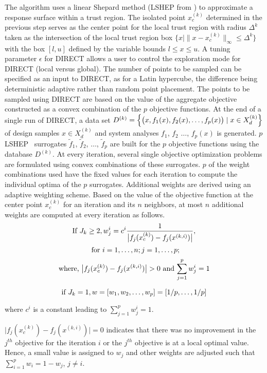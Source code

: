 \noindent The algorithm uses a linear Shepard method (LSHEP from 
\TZWBIB) to approximate a response surface within a trust region. The 
isolated point $x_c^{(k)}$ determined in the previous step serves as the center 
point for the local trust region with radius $\Delta^k$ taken as the 
intersection of the local trust region box $\bigl\{x\mid\|x-x_c^{(k)}\|_\infty 
\le\Delta^k \bigr\}$ with the box $[l,u]$ defined by the variable bounds $l\le 
x \le u$. A tuning parameter $\epsilon$ for DIRECT allows a user to control 
the exploration mode for DIRECT (local versus global). The number of points to 
be sampled can be specified as an input to DIRECT, as for a Latin hypercube, 
the difference being deterministic adaptive rather than random point placement. 
The points to be sampled using DIRECT are based on the value of the 
aggregate objective constructed as a convex combination of the $p$ objective 
functions. At the end of a single run of DIRECT, a data set $D^{(k)}={\Bigl\{
\bigl (x, f_1(x), f_2(x), \ldots, f_p(x)\bigr)\mid x\in X_d^{(k)} \Bigr\}}$ 
of design samples $x\in X_d^{(k)}$ and system analyses $f_1$, $f_2$
$\ldots$, $f_p(x)$ is generated. $p$ LSHEP \TZWBIB\ surrogates $\tilde f_1$,
$\tilde f_2$, $\ldots$, $\tilde f_p$ are built for the $p$ objective functions
using the database $D^{(k)}$. At every iteration, several single objective
optimization problems are formulated using convex combinations of these
surrogates. $p$ of the weight combinations used have the fixed values for 
each iteration to compute the individual optima of the $p$ surrogates.
Additional weights are derived using an adaptive weighting scheme. Based on the
value of the objective function at the center point $x_c^{(k)}$ for an
iteration and its $n$ neighbors, at most $n$ additional weights are computed at 
every iteration as follows. 
$$\hbox{If } J_k \ge 2, {w_j^i={c^i {1 \over {\bigl |f_j(x_c^{(k)})-f_j(x^{(k,i)})\bigr| }} }},$$ 
$$\hbox{  for } i=1,\ldots,n; j=1,\ldots,p;$$
$$\hbox{where, } {\bigl |f_j(x_c^{(k)})-f_j(x^{(k,i)})\bigr|}>0 \hbox{ and } {\sum_{j=1}^p w_j^i} = 1$$

$$\hbox{if } J_k = 1, w = [w_1,w_2,\ldots,w_p] = [1/p,\ldots,1/p]$$

\noindent where $c^i$ is a constant leading to ${\sum_{j=1}^p w_j^i}=1$. 

\noindent $\bigl |f_j(x_c^{(k)})-f_j(x^{(k,i)})\bigr|=0$ indicates that there 
was no improvement in the $j^{th}$ objective for the iteration $i$ or 
the $j^{th}$ objective is at a local optimal value. Hence, a small value is 
assigned to $w_j$ and other weights are adjusted such that 
${\sum_{i=1}^p w_i} = 1-w_j$, $j\ne i$.

